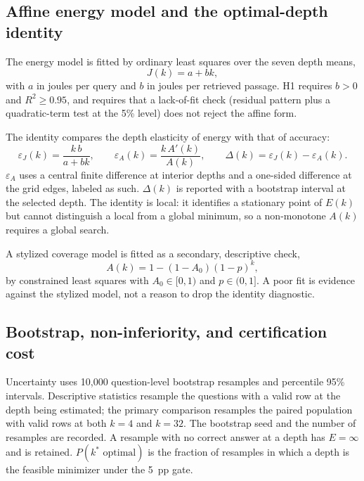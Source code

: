 \subsection{Affine energy model and the optimal-depth identity}

The energy model is fitted by ordinary least squares over the seven depth means,
\begin{equation}
J(k)=a+bk,
\label{s:eq:affine}
\end{equation}
with $a$ in joules per query and $b$ in joules per retrieved passage. H1 requires $b>0$ and
$R^2\ge0.95$, and requires that a lack-of-fit check (residual pattern plus a quadratic-term
test at the 5\% level) does not reject the affine form.

The identity compares the depth elasticity of energy with that of accuracy:
\begin{equation}
\varepsilon_J(k)=\frac{k\,b}{a+bk},
\qquad
\varepsilon_A(k)=\frac{k\,A'(k)}{A(k)},
\qquad
\Delta(k)=\varepsilon_J(k)-\varepsilon_A(k).
\label{s:eq:identity}
\end{equation}
$\varepsilon_A$ uses a central finite difference at interior depths and a one-sided difference
at the grid edges, labeled as such. $\Delta(k)$ is reported with a bootstrap interval at the
selected depth. The identity is local: it identifies a stationary point of $E(k)$ but cannot
distinguish a local from a global minimum, so a non-monotone $A(k)$ requires a global search.

A stylized coverage model is fitted as a secondary, descriptive check,
\begin{equation}
A(k)=1-(1-A_0)(1-p)^k,
\label{eq:coverage}
\end{equation}
by constrained least squares with $A_0\in[0,1)$ and $p\in(0,1]$. A poor fit is evidence against
the stylized model, not a reason to drop the identity diagnostic.

\subsection{Bootstrap, non-inferiority, and certification cost}

Uncertainty uses 10{,}000 question-level bootstrap resamples and percentile 95\% intervals.
Descriptive statistics resample the questions with a valid row at the depth being estimated;
the primary comparison resamples the paired population with valid rows at both $k=4$ and
$k=32$. The bootstrap seed and the number of resamples are recorded. A resample with no correct
answer at a depth has $E=\infty$ and is retained. $P(k^{*}\text{ optimal})$ is the fraction of
resamples in which a depth is the feasible minimizer under the 5~pp gate.

